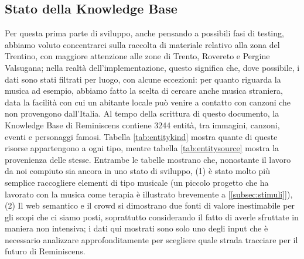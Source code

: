 \documentclass[sigproc-sp.tex]{subfiles}
\begin{document}
\subsection{Stato della Knowledge Base}
Per questa prima parte di sviluppo, anche pensando a possibili fasi di testing, abbiamo voluto concentrarci sulla raccolta di materiale relativo alla zona del Trentino, con maggiore attenzione alle zone di Trento, Rovereto e Pergine Valsugana; nella realtà dell’implementazione, questo significa che, dove possibile, i dati sono stati filtrati per luogo, con alcune eccezioni: per quanto riguarda la musica ad esempio, abbiamo fatto la scelta di cercare anche musica straniera, data la facilità con cui un abitante locale può venire a contatto con canzoni che non provengono dall’Italia. Al tempo della scrittura di questo documento, la Knowledge Base di Reminiscens contiene 3244 entità, tra immagini, canzoni, eventi e personaggi famosi. Tabella \ref{tab:entitykind} mostra quante di queste risorse appartengono a ogni tipo, mentre tabella \ref{tab:entitysource} mostra la provenienza delle stesse. Entrambe le tabelle mostrano che, nonostante il lavoro da noi compiuto sia ancora in uno stato di sviluppo, (1) è stato molto più semplice raccogliere elementi di tipo musicale (un piccolo progetto che ha lavorato con la musica come terapia è illustrato brevemente a [\ref{subsec:stimuli}]), (2) Il web semantico e il crowd si dimostrano due fonti di valore inestimabile per gli scopi che ci siamo posti, soprattutto considerando il fatto di averle sfruttate in maniera non intensiva; i dati qui mostrati sono solo uno degli input che è necessario analizzare approfonditamente per scegliere quale strada tracciare per il futuro di Reminiscens.
\end{document}
